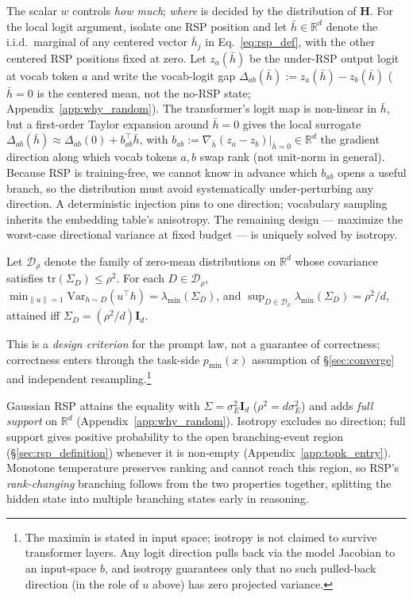 The scalar $w$ controls \emph{how much}; \emph{where} is decided by the distribution of $\mathbf{H}$. For the local logit argument, isolate one RSP position and let $\bar h \in \mathbb{R}^d$ denote the i.i.d.\ marginal of any centered vector $\bar h_j$ in Eq.~\eqref{eq:rsp_def}, with the other centered RSP positions fixed at zero. Let $z_a(\bar h)$ be the under-RSP output logit at vocab token $a$ and write the vocab-logit gap $\Delta_{ab}(\bar h) := z_a(\bar h) - z_b(\bar h)$ ($\bar h = 0$ is the centered mean, not the no-RSP state; Appendix~\ref{app:why_random}). The transformer's logit map is non-linear in $\bar h$, but a first-order Taylor expansion around $\bar h = 0$ gives the local surrogate $\Delta_{ab}(\bar h) \approx \Delta_{ab}(0) + b_{ab}^\top \bar h$, with $b_{ab} := \nabla_{\bar h}(z_a - z_b)|_{\bar h=0} \in \mathbb{R}^d$ the gradient direction along which vocab tokens $a, b$ swap rank (not unit-norm in general). Because RSP is training-free, we cannot know in advance which $b_{ab}$ opens a useful branch, so the distribution must avoid systematically under-perturbing any direction. A deterministic injection pins to one direction; vocabulary sampling inherits the embedding table's anisotropy. The remaining design --- maximize the worst-case directional variance at fixed budget --- is uniquely solved by isotropy.

\begin{proposition}\label{thm:minimax_directional_coverage}
Let $\mathcal{D}_\rho$ denote the family of zero-mean distributions on $\mathbb{R}^d$ whose covariance satisfies $\mathrm{tr}(\Sigma_D)\le\rho^2$. For each $D \in \mathcal{D}_\rho$, $\min_{\|u\|=1}\mathrm{Var}_{h\sim D}(u^\top h) = \lambda_{\min}(\Sigma_D)$, and $\sup_{D \in \mathcal{D}_\rho} \lambda_{\min}(\Sigma_D) = \rho^2/d$, attained iff $\Sigma_D = (\rho^2/d)\mathbf{I}_d$.
\end{proposition}

This is a \emph{design criterion} for the prompt law, not a guarantee of correctness; correctness enters through the task-side $p_{\min}(x)$ assumption of \S\ref{sec:converge} and independent resampling.\footnote{The maximin is stated in input space; isotropy is not claimed to survive transformer layers. Any logit direction pulls back via the model Jacobian to an input-space $b$, and isotropy guarantees only that no such pulled-back direction (in the role of $u$ above) has zero projected variance.}

Gaussian RSP attains the equality with $\Sigma = \sigma_E^2 \mathbf{I}_d$ ($\rho^2 = d\sigma_E^2$) and adds \emph{full support} on $\mathbb{R}^d$ (Appendix~\ref{app:why_random}). Isotropy excludes no direction; full support gives positive probability to the open branching-event region (\S\ref{sec:rsp_definition}) whenever it is non-empty (Appendix~\ref{app:topk_entry}). Monotone temperature preserves ranking and cannot reach this region, so RSP's \emph{rank-changing} branching follows from the two properties together, splitting the hidden state into multiple branching states early in reasoning.

